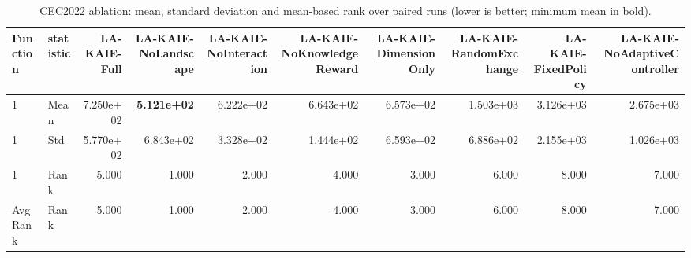 \begin{table}[t]
\centering
\scriptsize
\caption{CEC2022 ablation: mean, standard deviation and mean-based rank over paired runs (lower is better; minimum mean in bold).}
\label{tab:cec2022_ablation}
\begin{tabular}{llrrrrrrrr}
\hline
Function & statistic & LA-KAIE-Full & LA-KAIE-NoLandscape & LA-KAIE-NoInteraction & LA-KAIE-NoKnowledgeReward & LA-KAIE-DimensionOnly & LA-KAIE-RandomExchange & LA-KAIE-FixedPolicy & LA-KAIE-NoAdaptiveController \\
\hline
1 & Mean & 7.250e+02 & \textbf{5.121e+02} & 6.222e+02 & 6.643e+02 & 6.573e+02 & 1.503e+03 & 3.126e+03 & 2.675e+03 \\
1 & Std & 5.770e+02 & 6.843e+02 & 3.328e+02 & 1.444e+02 & 6.593e+02 & 6.886e+02 & 2.155e+03 & 1.026e+03 \\
1 & Rank & 5.000 & 1.000 & 2.000 & 4.000 & 3.000 & 6.000 & 8.000 & 7.000 \\
AvgRank & Rank & 5.000 & 1.000 & 2.000 & 4.000 & 3.000 & 6.000 & 8.000 & 7.000 \\
\hline
\end{tabular}
\end{table}
